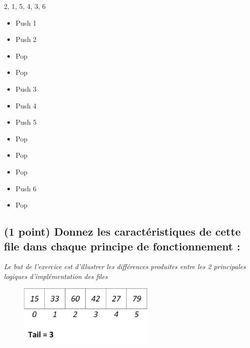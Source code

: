\documentclass[11pt,a4paper]{article}
\begin{document}
\begin{center}
\begin{table}[ht!]
\begin{minipage}{0.33\textwidth}
\begin{center}
\end{center}

  \end{minipage}
  \hfillx
  \begin{minipage}{0.33\textwidth}

\begin{center}
\begin{large}
2, 1, 5, 4, 3, 6
\end{large}

\medskip

\begin{itemize}
\item Push 1
\item Push 2
\item Pop
\item Pop
\item Push 3
\item Push 4
\item Push 5
\item Pop
\item Pop
\item Pop
\item Push 6
\item Pop
\end{itemize}

\end{center}

  \end{minipage}
\end{table}
\end{center}


\vfillLast

\clearpage


\subsection{(1 point) Donnez les caractéristiques de cette file dans chaque principe de fonctionnement : }

\begin{center}
\textit{Le but de l'exercice est d'illustrer les différences produites entre les 2 principales logiques d'implémentation des files}
\end{center}


\begin{figure}[ht!]
\centering
\centerline{  %
\includegraphics[height=3.0cm]{img/file_t_1_B.png}
}
\end{figure}
\end{document}
